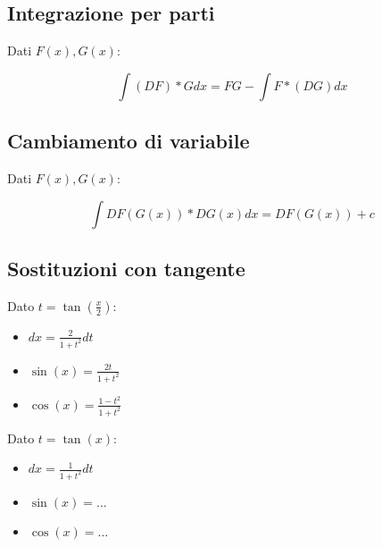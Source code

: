\documentclass{article}
\begin{document}
\subsection{Integrazione per parti}

Dati $F(x), G(x)$:

$$
\int (DF) * G dx = FG - \int F * (DG) dx
$$

\subsection{Cambiamento di variabile}

Dati $F(x), G(x)$:

$$
\int DF(G(x)) * DG(x) dx = DF(G(x)) + c
$$

\subsection{Sostituzioni con tangente}

Dato $t = \tan(\frac{x}{2})$:

\begin{itemize}
    \item $dx = \frac{2}{1 + t^2}dt$
    \item $\sin(x) = \frac{2t}{1 + t^2}$
    \item $\cos(x) = \frac{1 - t^2}{1 + t^2}$
\end{itemize}

\noindent
Dato $t = \tan(x)$:

\begin{itemize}
    \item $dx = \frac{1}{1 + t^2}dt$
    \item $\sin(x) = \dots$
    \item $\cos(x) = \dots$
\end{itemize}
\end{document}
